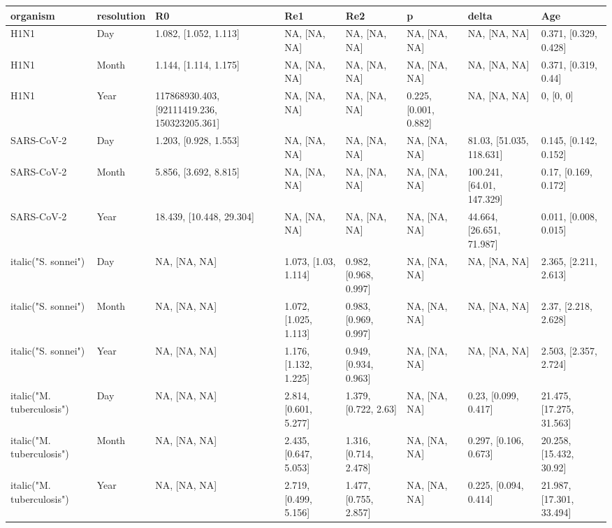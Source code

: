 \begin{table}[ht]
\centering
\begin{tabular}{llllllll}
  \hline
organism & resolution & R0 & Re1 & Re2 & p & delta & Age \\ 
  \hline
H1N1 & Day & 1.082, [1.052, 1.113] & NA, [NA, NA] & NA, [NA, NA] & NA, [NA, NA] & NA, [NA, NA] & 0.371, [0.329, 0.428] \\ 
  H1N1 & Month & 1.144, [1.114, 1.175] & NA, [NA, NA] & NA, [NA, NA] & NA, [NA, NA] & NA, [NA, NA] & 0.371, [0.319, 0.44] \\ 
  H1N1 & Year & 117868930.403, [92111419.236, 150323205.361] & NA, [NA, NA] & NA, [NA, NA] & 0.225, [0.001, 0.882] & NA, [NA, NA] & 0, [0, 0] \\ 
  SARS-CoV-2 & Day & 1.203, [0.928, 1.553] & NA, [NA, NA] & NA, [NA, NA] & NA, [NA, NA] & 81.03, [51.035, 118.631] & 0.145, [0.142, 0.152] \\ 
  SARS-CoV-2 & Month & 5.856, [3.692, 8.815] & NA, [NA, NA] & NA, [NA, NA] & NA, [NA, NA] & 100.241, [64.01, 147.329] & 0.17, [0.169, 0.172] \\ 
  SARS-CoV-2 & Year & 18.439, [10.448, 29.304] & NA, [NA, NA] & NA, [NA, NA] & NA, [NA, NA] & 44.664, [26.651, 71.987] & 0.011, [0.008, 0.015] \\ 
  italic("S. sonnei") & Day & NA, [NA, NA] & 1.073, [1.03, 1.114] & 0.982, [0.968, 0.997] & NA, [NA, NA] & NA, [NA, NA] & 2.365, [2.211, 2.613] \\ 
  italic("S. sonnei") & Month & NA, [NA, NA] & 1.072, [1.025, 1.113] & 0.983, [0.969, 0.997] & NA, [NA, NA] & NA, [NA, NA] & 2.37, [2.218, 2.628] \\ 
  italic("S. sonnei") & Year & NA, [NA, NA] & 1.176, [1.132, 1.225] & 0.949, [0.934, 0.963] & NA, [NA, NA] & NA, [NA, NA] & 2.503, [2.357, 2.724] \\ 
  italic("M. tuberculosis") & Day & NA, [NA, NA] & 2.814, [0.601, 5.277] & 1.379, [0.722, 2.63] & NA, [NA, NA] & 0.23, [0.099, 0.417] & 21.475, [17.275, 31.563] \\ 
  italic("M. tuberculosis") & Month & NA, [NA, NA] & 2.435, [0.647, 5.053] & 1.316, [0.714, 2.478] & NA, [NA, NA] & 0.297, [0.106, 0.673] & 20.258, [15.432, 30.92] \\ 
  italic("M. tuberculosis") & Year & NA, [NA, NA] & 2.719, [0.499, 5.156] & 1.477, [0.755, 2.857] & NA, [NA, NA] & 0.225, [0.094, 0.414] & 21.987, [17.301, 33.494] \\ 
   \hline
\end{tabular}
\end{table}
